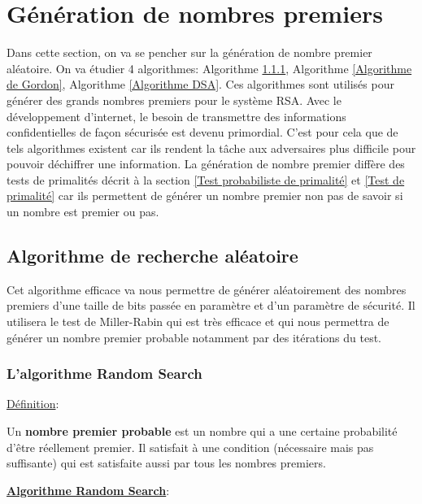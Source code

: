 \chapter{Génération de nombres premiers}

Dans cette section, on va se pencher sur la génération de nombre premier aléatoire. On va étudier 4 algorithmes: Algorithme \ref{Algorithme de recherche aléatoire}, Algorithme \ref{Algorithme de Gordon}, Algorithme \ref{Algorithme DSA}.
Ces algorithmes sont utilisés pour générer des grands nombres premiers pour le système RSA. 
Avec le développement d’internet, le besoin de transmettre des informations confidentielles de façon sécurisée est devenu primordial. C'est pour cela que de tels algorithmes existent car ils rendent la tâche aux adversaires plus difficile pour pouvoir déchiffrer une information.
La génération de nombre premier diffère des tests de primalités décrit à la section \ref{Test probabiliste de primalité} et \ref{Test de primalité} car ils permettent de générer un nombre premier non pas de savoir si un nombre est premier ou pas.

\section{Algorithme de recherche aléatoire}
Cet algorithme efficace va nous permettre de générer aléatoirement des nombres premiers d'une taille de bits passée en paramètre et d'un paramètre de sécurité. Il utilisera le test de Miller-Rabin qui est très efficace et qui nous permettra de générer un nombre premier probable notamment par des itérations du test.



\subsection{L'algorithme Random Search}
\label{Algorithme de recherche aléatoire}


\underline{Définition}:

Un \textbf{nombre premier probable} est un nombre qui a une certaine  probabilité d'être réellement premier. Il satisfait à une condition (nécessaire mais pas suffisante) qui est satisfaite aussi par tous les nombres premiers. 

\underline{\textbf{Algorithme Random Search}}:


